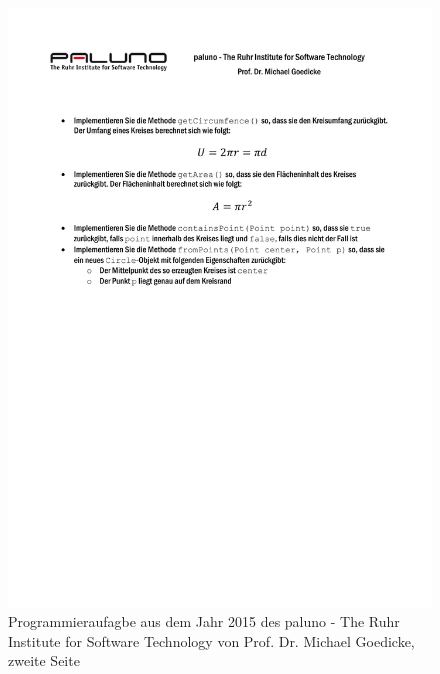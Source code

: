 \begin{figure} %
	\centering
	\includegraphics[width=1.0\textwidth]{images/Miniprojekt-1-S.2.pdf}
	\caption{Programmieraufagbe aus dem Jahr 2015 des paluno - The Ruhr Institute for Software Technology von Prof. Dr. Michael Goedicke, zweite Seite}
	\label{abb:Miniprojekt-1-S.2}
\end{figure}


